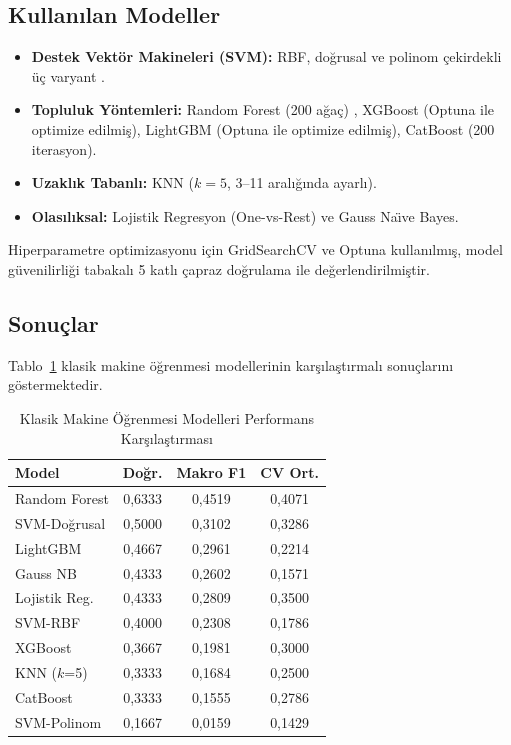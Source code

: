 \documentclass[conference]{IEEEtran}
\begin{document}
\subsection{Kullan{\i}lan Modeller}
\begin{itemize}
    \item \textbf{Destek Vekt\"{o}r Makineleri (SVM):} RBF, do\u{g}rusal ve polinom \c{c}ekirdekli \"{u}\c{c} varyant \cite{cortes1995support}.
    \item \textbf{Topluluk Y\"{o}ntemleri:} Random Forest (200 a\u{g}a\c{c}) \cite{breiman2001random}, XGBoost \cite{chen2016xgboost} (Optuna \cite{akiba2019optuna} ile optimize edilmi\c{s}), LightGBM \cite{ke2017lightgbm} (Optuna ile optimize edilmi\c{s}), CatBoost (200 iterasyon).
    \item \textbf{Uzakl{\i}k Tabanl{\i}:} KNN ($k=5$, 3--11 aral{\i}\u{g}{\i}nda ayarl{\i}).
    \item \textbf{Olas{\i}l{\i}ksal:} Lojistik Regresyon (One-vs-Rest) ve Gauss Na\"{\i}ve Bayes.
\end{itemize}

Hiperparametre optimizasyonu i\c{c}in GridSearchCV ve Optuna kullan{\i}lm{\i}\c{s}, model g\"{u}venilirli\u{g}i tabakal{\i} 5 katl{\i} \c{c}apraz do\u{g}rulama ile de\u{g}erlendirilmi\c{s}tir.

\subsection{Sonu\c{c}lar}
Tablo~\ref{tab:classical_ml} klasik makine \"{o}\u{g}renmesi modellerinin kar\c{s}{\i}la\c{s}t{\i}rmal{\i} sonu\c{c}lar{\i}n{\i} g\"{o}stermektedir.

\begin{table}[htbp]
\centering
\caption{Klasik Makine \"{O}\u{g}renmesi Modelleri Performans Kar\c{s}{\i}la\c{s}t{\i}rmas{\i}}
\label{tab:classical_ml}
\renewcommand{\arraystretch}{1.15}
\begin{tabular}{lccc}
\toprule
\textbf{Model} & \textbf{Do\u{g}r.} & \textbf{Makro F1} & \textbf{CV Ort.} \\
\midrule
Random Forest      & 0,6333 & 0,4519 & 0,4071 \\
SVM-Do\u{g}rusal  & 0,5000 & 0,3102 & 0,3286 \\
LightGBM           & 0,4667 & 0,2961 & 0,2214 \\
Gauss NB           & 0,4333 & 0,2602 & 0,1571 \\
Lojistik Reg.      & 0,4333 & 0,2809 & 0,3500 \\
SVM-RBF            & 0,4000 & 0,2308 & 0,1786 \\
XGBoost            & 0,3667 & 0,1981 & 0,3000 \\
KNN ($k$=5)        & 0,3333 & 0,1684 & 0,2500 \\
CatBoost           & 0,3333 & 0,1555 & 0,2786 \\
SVM-Polinom        & 0,1667 & 0,0159 & 0,1429 \\
\bottomrule
\end{tabular}
\end{table}
\end{document}
